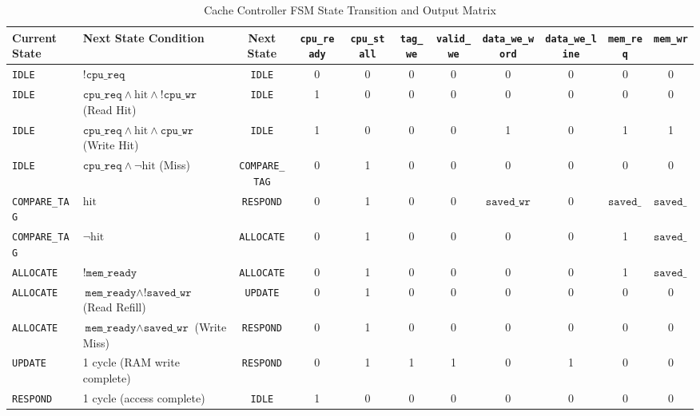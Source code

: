 \begin{table}[t]
\centering
\caption{Cache Controller FSM State Transition and Output Matrix}
\label{tab:fsm_transitions}
\begin{tabular}{llccccccccc}
\hline
\textbf{Current State} & \textbf{Next State Condition} & \textbf{Next State} & \texttt{cpu\_ready} & \texttt{cpu\_stall} & \texttt{tag\_we} & \texttt{valid\_we} & \texttt{data\_we\_word} & \texttt{data\_we\_line} & \texttt{mem\_req} & \texttt{mem\_wr} \\
\hline
\texttt{IDLE} & $\texttt{!cpu\_req}$ & \texttt{IDLE} & 0 & 0 & 0 & 0 & 0 & 0 & 0 & 0 \\
\texttt{IDLE} & $\texttt{cpu\_req} \land \mathrm{hit} \land \texttt{!cpu\_wr}$ (Read Hit) & \texttt{IDLE} & 1 & 0 & 0 & 0 & 0 & 0 & 0 & 0 \\
\texttt{IDLE} & $\texttt{cpu\_req} \land \mathrm{hit} \land \texttt{cpu\_wr}$ (Write Hit) & \texttt{IDLE} & 1 & 0 & 0 & 0 & 1 & 0 & 1 & 1 \\
\texttt{IDLE} & $\texttt{cpu\_req} \land \neg\mathrm{hit}$ (Miss) & \texttt{COMPARE\_TAG} & 0 & 1 & 0 & 0 & 0 & 0 & 0 & 0 \\
\hline
\texttt{COMPARE\_TAG} & $\mathrm{hit}$ & \texttt{RESPOND} & 0 & 1 & 0 & 0 & $\texttt{saved\_wr}$ & 0 & $\texttt{saved\_wr}$ & $\texttt{saved\_wr}$ \\
\texttt{COMPARE\_TAG} & $\neg\mathrm{hit}$ & \texttt{ALLOCATE} & 0 & 1 & 0 & 0 & 0 & 0 & 1 & $\texttt{saved\_wr}$ \\
\hline
\texttt{ALLOCATE} & $\texttt{!mem\_ready}$ & \texttt{ALLOCATE} & 0 & 1 & 0 & 0 & 0 & 0 & 1 & $\texttt{saved\_wr}$ \\
\texttt{ALLOCATE} & $\texttt{mem\_ready} \land \texttt{!saved\_wr}$ (Read Refill) & \texttt{UPDATE} & 0 & 1 & 0 & 0 & 0 & 0 & 0 & 0 \\
\texttt{ALLOCATE} & $\texttt{mem\_ready} \land \texttt{saved\_wr}$ (Write Miss) & \texttt{RESPOND} & 0 & 1 & 0 & 0 & 0 & 0 & 0 & 0 \\
\hline
\texttt{UPDATE} & 1 cycle (RAM write complete) & \texttt{RESPOND} & 0 & 1 & 1 & 1 & 0 & 1 & 0 & 0 \\
\hline
\texttt{RESPOND} & 1 cycle (access complete) & \texttt{IDLE} & 1 & 0 & 0 & 0 & 0 & 0 & 0 & 0 \\
\hline
\end{tabular}
\end{table}

